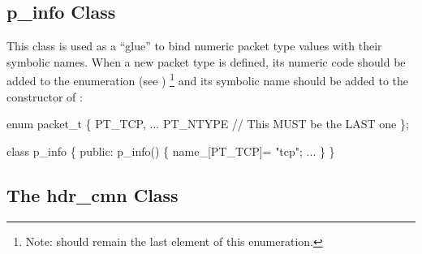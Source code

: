 \subsection{p\_info Class}
\label{sec:pinfoclass}

This class is used as a ``glue'' to bind numeric packet type values
with their symbolic names.  When a new packet type is defined, its
numeric code should be added to the enumeration  (see
) \footnote{Note:  should remain the last element of this
enumeration.} and its symbolic name should be added to the constructor
of :
\begin{program}
enum packet_t \{
        PT_TCP,
        ...
        PT_NTYPE // This MUST be the LAST one
\};

class p_info \{
public:
        p_info() \{
                name_[PT_TCP]= "tcp";
                ...
        \}
\}
\end{program}
\subsection{The hdr\_cmn Class}
\label{sec:commonhdr}

